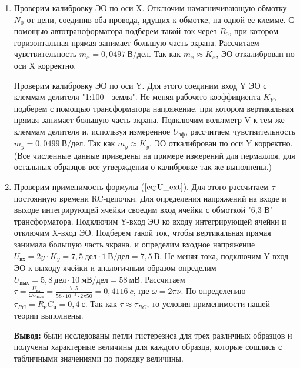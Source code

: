 \documentclass[a4paper, 12pt]{article}
\begin{document}
\begin{enumerate}
\item Проверим калибровку ЭО по оси X. Отключим намагничивающую обмотку $N_0$ от цепи, соединив оба провода, идущих к обмотке, на одной ее клемме. С помощью автотрансформатора подберем такой ток через $R_0$, при котором горизонтальная прямая занимает большую часть экрана. Рассчитаем чувствительность $m_x=0,0497\ В/дел$. Так как $m_x\approx K_x$, ЭО откалиброван по оси X корректно.

Проверим калибровку ЭО по оси Y. Для этого соединим вход Y ЭО с клеммам делителя "1:100 - земля". Не меняя рабочего коэффициента $K_Y$, подберем с помощью трансформатора напряжение, при котором вертикальная прямая занимает большую часть экрана. Подключим вольтметр V к тем же клеммам делителя и, используя измеренное $U_{эф}$, рассчитаем чувствительность $m_y=0,0499\ В/дел$. Так как $m_y\approx K_y$, ЭО откалиброван по оси Y корректно. (Все численные данные приведены на примере измерений для пермаллоя, для остальных образцов все утверждения о калибровке так же выполнены.)  

\item Проверим применимость формулы ($\ref{eq:U_ext}$). Для этого рассчитаем $\tau$ - постоянную времени RC-цепочки. Для определения напряжений на входе и выходе интегрирующей ячейки своедим вход ячейки с обмоткой "6,3 В" трансформатора. Подключим Y-вход ЭО ко входу интегрирующей ячейки и отключим X-вход ЭО. Подберем такой ток, чтобы вертикальная прямая занимала большую часть экрана, и определим входное напряжение $U_{вх}=2y\cdot K_y=7,5\ дел \cdot 1\ В/дел=7,5\ В$. Не меняя тока, подключим Y-вход ЭО к выходу ячейки и аналогичным образом определим $U_{вых}=5,8\ дел\cdot 10\ мВ/дел=58\ мВ$. Рассчитаем $\tau=\frac{U_{вх}}{\omega U_{вых}}=\frac{7,5}{58\cdot10^{-3}\cdot2\pi 50}=0,4116\ c$, где $\omega=2\pi\nu$. По определению $\tau_{RC}=R_иC_и=0,4\ с$. Так как $\tau\approx\tau_{RC}$, то условия применимости нашей теории выполнены.

\textbf{Вывод:} были исследованы петли гистерезиса для трех различных образцов и получены характерные величины для каждого образца, которые сошлись с табличными значениями по порядку величины. 
\end{enumerate}
\end{document}
